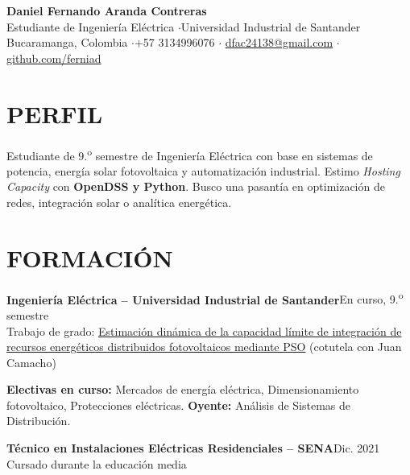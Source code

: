 \documentclass[10pt,a4paper]{article}
\newcommand{\entrada}[3]{%
    \noindent\textbf{#1}\hfill{\small\color{secundario}#2}\\[-1pt]
    {\small\color{secundario}#3}\par\vspace{2pt}%
}
\begin{document}
\begin{center}
    {\fontsize{21}{24}\selectfont\bfseries\color{primario} Daniel Fernando Aranda Contreras}\\[4pt]
    {\small\color{secundario} Estudiante de Ingeniería Eléctrica \quad$\cdot$\quad Universidad Industrial de Santander}\\[4pt]
    {\small
        Bucaramanga, Colombia \quad$\cdot$\quad +57 3134996076 \quad$\cdot$\quad
        \href{mailto:dfac24138@gmail.com}{dfac24138@gmail.com} \quad$\cdot$\quad
        \href{https://github.com/ferniad}{github.com/ferniad}
    }
\end{center}

\section*{PERFIL}
Estudiante de 9.\textsuperscript{o} semestre de Ingeniería Eléctrica con base en sistemas de potencia, energía solar fotovoltaica y automatización industrial. Estimo \textit{Hosting Capacity} con \textbf{OpenDSS y Python}. Busco una pasantía en optimización de redes, integración solar o analítica energética.

\section*{FORMACIÓN}

\entrada{Ingeniería Eléctrica -- Universidad Industrial de Santander}{En curso, 9.\textsuperscript{o} semestre}{%
Trabajo de grado: \href{https://www.zotero.org/groups/6637268/camacho-aranda-tesis-uis}{Estimación dinámica de la capacidad límite de integración de recursos energéticos distribuidos fotovoltaicos mediante PSO} (cotutela con Juan Camacho)}
{\small\textbf{Electivas en curso:} Mercados de energía eléctrica, Dimensionamiento fotovoltaico, Protecciones eléctricas. \textbf{Oyente:} Análisis de Sistemas de Distribución.}
\vspace{5pt}

\entrada{Técnico en Instalaciones Eléctricas Residenciales -- SENA}{Dic. 2021}{Cursado durante la educación media}
\end{document}
